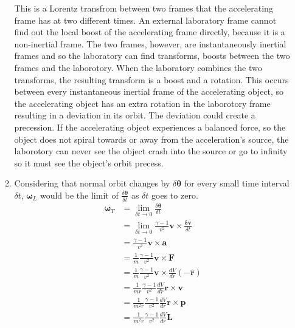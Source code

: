 \documentclass[12pt,a4]{article}
\begin{document}
\begin{enumerate}
\begin{enumerate}
        This is a Lorentz transfrom between two frames that the accelerating frame has at two different times.
        An external laboratory frame cannot find out the local boost of the accelerating frame directly, because it is a non-inertial frame.
        The two frames, however, are instantaneously inertial frames and so the laboratory can find transforms, boosts between the two frames and the laborotory.
        When the laboratory combines the two transforms, the resulting transform is a boost and a rotation.
        This occurs between every instantaneous inertial frame of the accelerating object, so the accelerating object has an extra rotation in the laborotory frame resulting in a deviation in its orbit.
        The deviation could create a precession.
        If the accelerating object experiences a balanced force, so the object does not spiral towards or away from the acceleration's source, the laborotory can never see the object crash into the source or go to infinity so it must see the object's orbit precess.
      \item
        Considering that normal orbit changes by $\delta \boldsymbol{\theta}$ for every small time interval $\delta t$, $\boldsymbol{\omega}_L$ would be the limit of $\frac{\delta \boldsymbol{\theta}}{\delta t}$ as $\delta t$ goes to zero.
        \begin{align*}
          \boldsymbol{\omega}_T &= \lim_{\delta t \to 0} \frac{\delta \boldsymbol{\theta}}{\delta t}\\
                                &= \lim_{\delta t \to 0} \frac{\gamma - 1}{v^2} \mathbf{v} \times \frac{\mathbf{\delta v}}{\delta t}\\
                                &= \frac{\gamma - 1}{v^2} \mathbf{v} \times \mathbf{a}\\
                                &= \frac{1}{m}\frac{\gamma - 1}{v^2} \mathbf{v} \times \mathbf{F}\\
                                &= \frac{1}{m}\frac{\gamma - 1}{v^2} \mathbf{v} \times \frac{d V}{dr} (-\mathbf{\hat r})\\
                                &= \frac{1}{mr}\frac{\gamma - 1}{v^2}  \frac{d V}{dr} \mathbf{r}\times \mathbf{v} \\
                                &= \frac{1}{m^2r}\frac{\gamma - 1}{v^2}  \frac{d V}{dr} \mathbf{r}\times \mathbf{p} \\
                                &= \frac{1}{m^2r}\frac{\gamma - 1}{v^2}  \frac{d V}{dr} \mathbf{L} 
        \end{align*}

\end{enumerate}
\end{enumerate}
\end{document}
